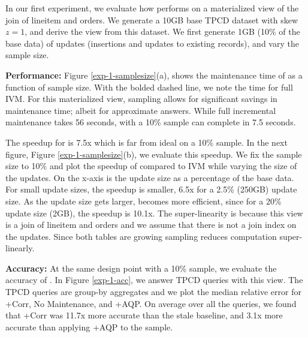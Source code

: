 
In our first experiment, we evaluate how \svc performs on a materialized view of the join of \textsf{lineitem} and \textsf{orders}.
We generate a 10GB base TPCD dataset with skew $z=1$, and derive the view from this dataset.
We first generate 1GB (10\% of the base data) of updates (insertions and updates to existing records), and vary the sample size.

\textbf{Performance: }
Figure \ref{exp-1-samplesize}(a), shows the maintenance time of \svc as a function of sample size.
With the bolded dashed line, we note the time for full IVM. 
For this materialized view, sampling allows for significant savings in maintenance time; albeit for approximate answers.
While full incremental maintenance takes 56 seconds, \svc with a 10\% sample can complete in 7.5 seconds.

The speedup for  is 7.5x which is far from ideal on a 10\% sample.
In the next figure, Figure \ref{exp-1-samplesize}(b), we evaluate this speedup. 
We fix the sample size to 10\% and plot the speedup of \svc compared to IVM while varying the size of the updates.
On the x-axis is the update size as a percentage of the base data.
For small update sizes, the speedup is smaller, 6.5x for a 2.5\% (250GB) update size.
As the update size gets larger, \svc becomes more efficient, since for a 20\% update size (2GB), the speedup is 10.1x. 
The super-linearity is because this view is a join of \textsf{lineitem} and \textsf{orders} and we assume that there is not a join index on the updates.
Since both tables are growing sampling reduces computation super-linearly. 

\textbf{Accuracy: }
At the same design point with a 10\% sample, we evaluate the accuracy of \svc.
In Figure \ref{exp-1-acc}, we answer TPCD queries with this view.
The TPCD queries are group-by aggregates and we plot the median relative error for \svcnospace+Corr, No Maintenance, and \svcnospace+AQP.
On average over all the queries, we found that \svcnospace+Corr was 11.7x more accurate than the stale baseline, and 3.1x more accurate than applying \svcnospace+AQP to the sample.


